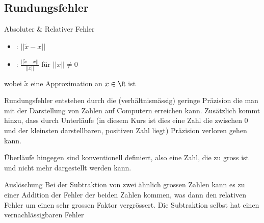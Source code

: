 \subsection{Rundungsfehler}

\begin{definition}[]{Absoluter \& Relativer Fehler}
    \begin{multicols}{2}
        \begin{itemize}
            \item {}: $||\tilde{x} - x||$
            \item {}: $\displaystyle \frac{||\tilde{x} - x||}{||x||}$ für $||x|| \neq 0$ 
        \end{itemize}
    \end{multicols}
    wobei $\tilde{x}$ eine Approximation an $x \in \R$ ist
\end{definition}

Rundungsfehler entstehen durch die (verhältnismässig) geringe Präzision die man mit der Darstellung von Zahlen auf Computern erreichen kann.
Zusätzlich kommt hinzu, dass durch Unterläufe (in diesem Kurs ist dies eine Zahl die zwischen $0$ und der kleinsten darstellbaren, positiven Zahl liegt) Präzision verloren gehen kann.

Überläufe hingegen sind konventionell definiert, also eine Zahl, die zu gross ist und nicht mehr dargestellt werden kann.


\begin{remark}[]{Auslöschung}
    Bei der Subtraktion von zwei ähnlich grossen Zahlen kann es zu einer Addition der Fehler der beiden Zahlen kommen, was dann den relativen Fehler um einen sehr grossen Faktor vergrössert.
    Die Subtraktion selbst hat einen vernachlässigbaren Fehler
\end{remark}
